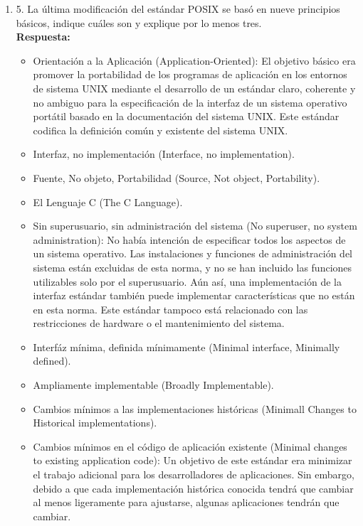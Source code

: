 \documentclass[a4paper, 11pt, oneside]{article}
\begin{document}
\begin{enumerate}
    \item 5. La última modificación del estándar POSIX se basó en nueve principios básicos,
    indique cuáles son y explique por lo menos tres.\\
    \textbf{Respuesta:}
    \begin{itemize}
        \item Orientación a la Aplicación (Application-Oriented): 
    El objetivo básico era promover la portabilidad de los programas de aplicación en los entornos de sistema UNIX mediante el desarrollo de un estándar claro, coherente y no ambiguo para la especificación de la interfaz de un sistema operativo portátil basado en la documentación del sistema UNIX. Este estándar codifica la definición común y existente del sistema UNIX.
        \item Interfaz, no implementación (Interface, no implementation).
        \item Fuente, No objeto, Portabilidad (Source, Not object, Portability).
        \item El Lenguaje C (The C Language).
        \item Sin superusuario, sin administración del sistema (No superuser, no system administration): 
    No había intención de especificar todos los aspectos de un sistema operativo. Las instalaciones y funciones de administración del sistema están excluidas de esta norma, y no se han incluido las funciones utilizables solo por el superusuario. Aún así, una implementación de la interfaz estándar también puede implementar características que no están en esta norma. Este estándar tampoco está relacionado con las restricciones de hardware o el mantenimiento del sistema.
        \item Interfáz mínima, definida mínimamente (Minimal interface, Minimally defined).
        \item Ampliamente implementable (Broadly Implementable).
        \item Cambios mínimos a las implementaciones históricas (Minimall Changes to Historical implementations).
        \item Cambios mínimos en el código de aplicación existente (Minimal changes to existing application code): Un objetivo de este estándar era minimizar el trabajo adicional para los desarrolladores de aplicaciones. Sin embargo, debido a que cada implementación histórica conocida tendrá que cambiar al menos ligeramente para ajustarse, algunas aplicaciones tendrán que cambiar.


    \end{itemize}
    

\end{enumerate}
\end{document}
